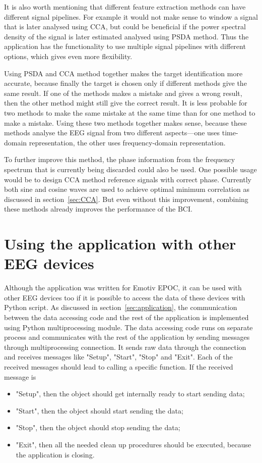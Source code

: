It is also worth mentioning that different \gls{feature extraction} methods can have different signal pipelines. For example it would not make sense to \gls{window} a signal that is later analysed using \gls{CCA}, but  could be beneficial if the \gls{power spectral density} of the signal is later estimated analysed using \gls{PSDA} method. Thus the application has the functionality to use multiple signal pipelines with different options, which gives even more flexibility.

Using \gls{PSDA} and \gls{CCA} method together makes the \gls{target} identification more accurate, because finally the \gls{target} is chosen only if different methods give the same result. If one of the methods makes a mistake and gives a wrong result, then the other method might still give the correct result. It is less probable for two methods to make the same mistake at the same time than for one method to make a mistake. Using these two methods together makes sense, because these methods analyse the \gls{EEG} signal from two different aspects---one uses time-domain representation, the other uses frequency-domain representation.

To further improve this method, the phase information from the \gls{frequency spectrum} that is currently being discarded could also be used. One possible usage would be to design \gls{CCA} method \glspl{reference signal} with correct phase. Currently both sine and cosine waves are used to achieve optimal minimum correlation as discussed in section~\ref{sec:CCA}. But even without this improvement, combining these methods already improves the performance of the \gls{BCI}.

\section{Using the application with other EEG devices}
\label{sec:different_devices}

Although the application was written for Emotiv EPOC, it can be used with other \gls{EEG} devices too if it is possible to access the data of these devices with Python script. As discussed in section~\ref{sec:application}, the communication between the data accessing code and the rest of the application is implemented using Python multiprocessing module. The data accessing code runs on separate process and communicates with the rest of the application by sending messages through multiprocessing connection. It sends raw data through the connection and receives messages like "Setup", "Start", "Stop" and "Exit". Each of the received messages should lead to calling a specific function. If the received message is
\begin{itemize}
	\item "Setup", then the object should get internally ready to start sending data;
	\item "Start", then the object should start sending the data;
	\item "Stop", then the object should stop sending the data;
	\item "Exit", then all the needed clean up procedures should be executed, because the application is closing.
\end{itemize}

